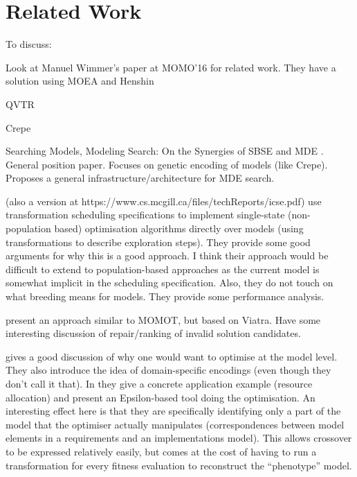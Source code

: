 \section{Related Work}
\label{section:related_work}

	\begin{draftlist}
		To discuss:
		\item Look at Manuel Wimmer's paper at MOMO'16 for related work. They have a solution using MOEA and Henshin
		\item QVTR
		\item Crepe
		\item Searching Models, Modeling Search: On the Synergies of SBSE and MDE \cite{Kessentini+13}. General position paper. Focuses on genetic encoding of models 
		      (like Crepe). Proposes a general infrastructure/architecture for MDE search.
		\item \cite{Denil+14} (also a version at https://www.cs.mcgill.ca/files/techReports/icse.pdf) use transformation scheduling specifications to implement 
		      single-state (non-population based) optimisation algorithms directly over models 
		      (using transformations to describe exploration steps). They provide some good arguments for why this is a good approach. I think their approach would be
					difficult to extend to population-based approaches as the current model is somewhat implicit in the scheduling specification. Also, they do not touch on
					what breeding means for models. They provide some performance analysis.
					
					
		\item \cite{Abdeen+14} present an approach similar to MOMOT, but based on Viatra. Have some interesting discussion of repair/ranking of invalid solution
		      candidates.
					
	  \item \cite{BurtonPoulding13} gives a good discussion of why one would want to optimise at the model level. They also introduce the idea of domain-specific
		      encodings (even though they don't call it that). In \cite{Burton+12} they give a concrete application example (resource allocation) and present an 
					Epsilon-based tool doing the optimisation. An interesting effect here is that they are specifically identifying only a part of the model that the optimiser
					actually manipulates (correspondences between model elements in a requirements and an implementations model). This allows crossover to be expressed
					relatively easily, but comes at the cost of having to run a transformation for every fitness evaluation to reconstruct the ``phenotype'' model.
	\end{draftlist}
